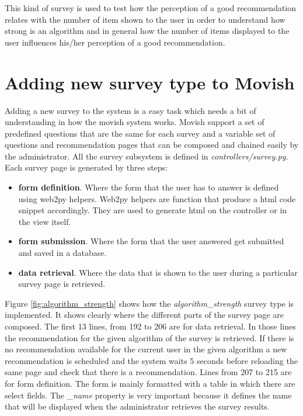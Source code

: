 This kind of survey is used to test how the perception of a good recommendation relates with the number of item shown to the user in order to understand how strong is an algorithm and in general how the number of items displayed to the user influences his/her perception of a good recommendation.  

\section{Adding new survey type to Movish}
\label{sec:adding_new_survey_type_to_Movish}

Adding a new survey to the system is a easy task which needs a bit of understanding in how the movish system works. Movish support a set of predefined questions that are the same for each survey and a variable set of questions and recommendation pages that can be composed and chained easily by the administrator. All the survey subsystem is defined in \textit{controllers/survey.py}. Each survey page is generated by three steps:

\begin{itemize}
\item \textbf{form definition}. Where the form that the user has to answer is defined using web2py \cite{web2py} helpers. Web2py helpers are function that produce a html code snippet accordingly. They are used to generate html on the controller or in the view itself.
\item \textbf{form submission}. Where the form that the user answered get submitted and saved in a database.
\item \textbf{data retrieval}. Where the data that is shown to the user during a particular survey page is retrieved.
\end{itemize}

Figure \ref{fig:algorithm_strength} shows how the \textit{algorithm\_strength} survey type is implemented. It shows clearly where the different parts of the survey page are composed. The first 13 lines, from 192 to 206 are for data retrieval. In those lines the recommendation for the given algorithm of the survey is retrieved. If there is no recommendation available for the current user in the given algorithm a new recommendation is scheduled and the system waits 5 seconds before reloading the same page and check that there is a recommendation. Lines from 207 to 215 are for form definition. The form is mainly formatted with a table in which there are select fields. The \textit{\_name} property is very important because it defines the name that will be displayed when the administrator retrieves the survey results.  

